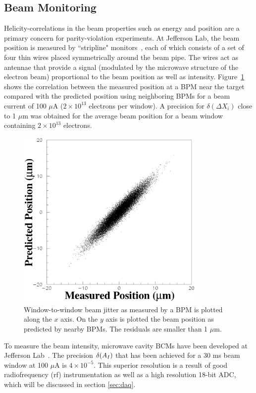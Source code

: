 \subsection{Beam Monitoring}
\label{sec:beam_mon}

Helicity-correlations in the beam properties such as energy and position are
a primary concern for parity-violation experiments.  
At Jefferson Lab, the beam position is measured by ``stripline"
monitors~\cite{stripline}, each of which consists of a set of four thin wires
placed symmetrically around the beam pipe. The wires act as antennae
that provide a signal (modulated by the microwave structure of the
electron beam) proportional to the beam position as well as
intensity. Figure~\ref{fig5:jlabcorr} shows the correlation between
the measured position at a BPM near the target compared with the
predicted position using neighboring BPMs for a beam current of
100 $\mu$A ($2\times 10^{13}$ electrons per window). A precision
for $\delta(\Delta X_i)$ close to 1 $\mu$m was obtained for the
average beam position for a beam window containing $2\times
10^{13}$ electrons.

\begin{figure}[tb]
\begin{center}
\includegraphics[width=3.6in]{RM/fig5_ycorrbw.eps}
\caption{Window-to-window beam jitter as measured
by a BPM is 
plotted along the $x$ axis. On the $y$ axis is plotted the beam
position as predicted by nearby BPMs. The residuals are smaller
than 1 $\mu$m.}
\label{fig5:jlabcorr}
\end{center}
\end{figure}

To measure the beam intensity, microwave cavity BCMs have been
developed at Jefferson Lab~\cite{A-NIM}. The precision $\delta(A_I)$ that has
been achieved for a 30 ms beam window at 100 $\mu$A is $4\times
10^{-5}$. This superior resolution is a 
result of good radiofrequency (rf)
instrumentation as well as a high resolution 18-bit ADC, which
will be discussed in section \ref{sec:daq}.

